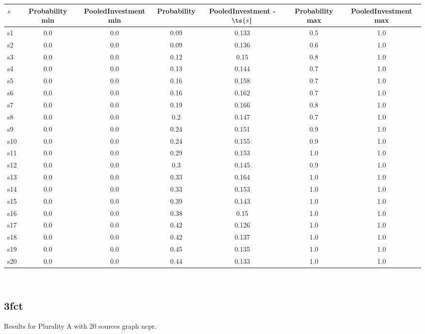 \documentclass{article}
\begin{document}
\noindent\begin{tabular}{|l|c|c|c|c|c|c|}
\hline
$s$& Probability min & PooledInvestment min & Probability & PooledInvestment - $\ts{s}$ & Probability max & PooledInvestment max\\
\hline
s1 &0.0 & 0.0 & 0.09 & 0.133 & 0.5 & 1.0\\
\hline
s2 &0.0 & 0.0 & 0.09 & 0.136 & 0.6 & 1.0\\
\hline
s3 &0.0 & 0.0 & 0.12 & 0.15 & 0.8 & 1.0\\
\hline
s4 &0.0 & 0.0 & 0.13 & 0.144 & 0.7 & 1.0\\
\hline
s5 &0.0 & 0.0 & 0.16 & 0.158 & 0.7 & 1.0\\
\hline
s6 &0.0 & 0.0 & 0.16 & 0.162 & 0.7 & 1.0\\
\hline
s7 &0.0 & 0.0 & 0.19 & 0.166 & 0.8 & 1.0\\
\hline
s8 &0.0 & 0.0 & 0.2 & 0.147 & 0.7 & 1.0\\
\hline
s9 &0.0 & 0.0 & 0.24 & 0.151 & 0.9 & 1.0\\
\hline
s10 &0.0 & 0.0 & 0.24 & 0.155 & 0.9 & 1.0\\
\hline
s11 &0.0 & 0.0 & 0.29 & 0.153 & 1.0 & 1.0\\
\hline
s12 &0.0 & 0.0 & 0.3 & 0.145 & 0.9 & 1.0\\
\hline
s13 &0.0 & 0.0 & 0.33 & 0.164 & 1.0 & 1.0\\
\hline
s14 &0.0 & 0.0 & 0.33 & 0.153 & 1.0 & 1.0\\
\hline
s15 &0.0 & 0.0 & 0.39 & 0.143 & 1.0 & 1.0\\
\hline
s16 &0.0 & 0.0 & 0.38 & 0.15 & 1.0 & 1.0\\
\hline
s17 &0.0 & 0.0 & 0.42 & 0.126 & 1.0 & 1.0\\
\hline
s18 &0.0 & 0.0 & 0.42 & 0.137 & 1.0 & 1.0\\
\hline
s19 &0.0 & 0.0 & 0.45 & 0.135 & 1.0 & 1.0\\
\hline
s20 &0.0 & 0.0 & 0.44 & 0.133 & 1.0 & 1.0\\
\hline
\end{tabular}\\

\newpage

\subsection{3fct}

\noindent Results for Plurality A with 20 sources graph ncpr.
\end{document}
